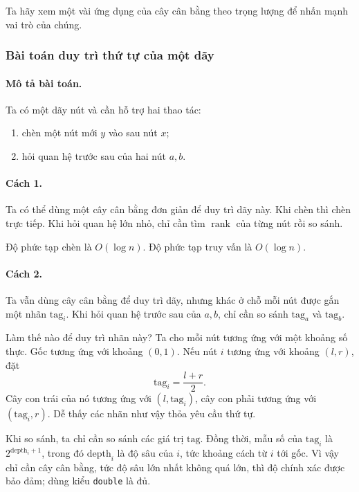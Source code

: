 \documentclass[11pt]{article}
\begin{document}
Ta hãy xem một vài ứng dụng của cây cân bằng theo trọng lượng để nhấn mạnh
vai trò của chúng.

\subsubsection{Bài toán duy trì thứ tự của một dãy}

\paragraph{Mô tả bài toán.}
Ta có một dãy nút và cần hỗ trợ hai thao tác:
\begin{enumerate}
  \item chèn một nút mới \(y\) vào sau nút \(x\);
  \item hỏi quan hệ trước sau của hai nút \(a,b\).
\end{enumerate}

\paragraph{Cách 1.}
Ta có thể dùng một cây cân bằng đơn giản để duy trì dãy này. Khi chèn thì
chèn trực tiếp. Khi hỏi quan hệ lớn nhỏ, chỉ cần tìm \(\operatorname{rank}\)
của từng nút rồi so sánh.

Độ phức tạp chèn là \(O(\log n)\). Độ phức tạp truy vấn là \(O(\log n)\).

\paragraph{Cách 2.}
Ta vẫn dùng cây cân bằng để duy trì dãy, nhưng khác ở chỗ mỗi nút được gắn
một nhãn \(\mathrm{tag}_i\). Khi hỏi quan hệ trước sau của \(a,b\), chỉ cần
so sánh \(\mathrm{tag}_a\) và \(\mathrm{tag}_b\).

Làm thế nào để duy trì nhãn này? Ta cho mỗi nút tương ứng với một khoảng số
thực. Gốc tương ứng với khoảng \((0,1)\). Nếu nút \(i\) tương ứng với
khoảng \((l,r)\), đặt
\[
  \mathrm{tag}_i=\frac{l+r}{2}.
\]
Cây con trái của nó tương ứng với \((l,\mathrm{tag}_i)\), cây con phải tương
ứng với \((\mathrm{tag}_i,r)\). Dễ thấy các nhãn như vậy thỏa yêu cầu thứ tự.

Khi so sánh, ta chỉ cần so sánh các giá trị \(\mathrm{tag}\). Đồng thời,
mẫu số của \(\mathrm{tag}_i\) là \(2^{\mathrm{depth}_i+1}\), trong đó
\(\mathrm{depth}_i\) là độ sâu của \(i\), tức khoảng cách từ \(i\) tới gốc.
Vì vậy chỉ cần cây cân bằng, tức độ sâu lớn nhất không quá lớn, thì độ chính
xác được bảo đảm; dùng kiểu \texttt{double} là đủ.
\end{document}
